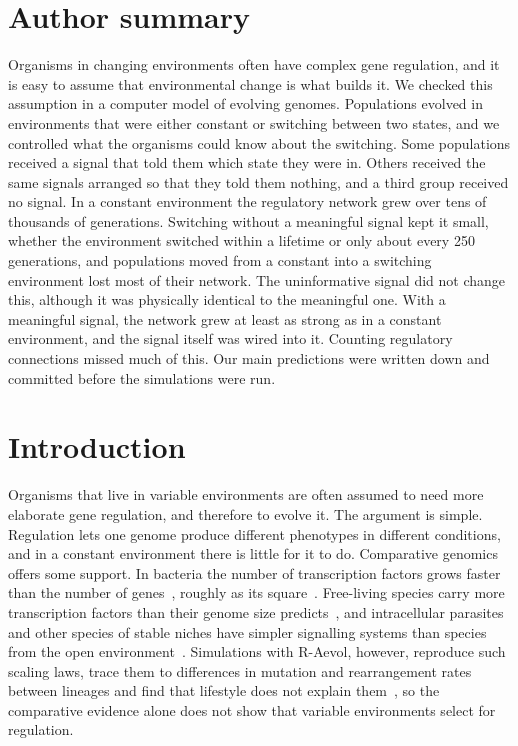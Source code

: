 \documentclass[10pt,letterpaper]{article}
\begin{document}
\section*{Author summary}
Organisms in changing environments often have complex gene regulation, and it
is easy to assume that environmental change is what builds it. We checked this
assumption in a computer model of evolving genomes. Populations evolved in
environments that were either constant or switching between two states, and we
controlled what the organisms could know about the switching. Some populations
received a signal that told them which state they were in. Others received the
same signals arranged so that they told them nothing, and a third group received
no signal. In a constant environment the regulatory network grew over tens of thousands
of generations. Switching without a meaningful signal kept it small, whether
the environment switched within a lifetime or only about every 250 generations,
and populations moved from a constant into a switching environment lost most of
their network. The uninformative signal did not change this, although it was
physically identical to the meaningful one. With a meaningful signal, the network
grew at least as strong as in a constant environment, and the signal itself was
wired into it. Counting regulatory connections missed much of this. Our main predictions were written down and committed before the simulations
were run.

\clearpage
{}
\fancyheadoffset[L]{0pt}\fancyfootoffset[L]{0pt}
\linenumbers

\section*{Introduction}

Organisms that live in variable environments are often assumed to need more
elaborate gene regulation, and therefore to evolve it. The argument is simple.
Regulation lets one genome produce different phenotypes in different
conditions, and in a constant environment there is little for it to do.
Comparative genomics offers some support. In bacteria the number of
transcription factors grows faster than the number of genes~\cite{konstantinidis2004},
roughly as its square~\cite{vannimwegen2003}. Free-living species carry more
transcription factors than their genome size predicts~\cite{cases2003}, and
intracellular parasites and other species of stable niches have simpler
signalling systems than species from the open environment~\cite{galperin2005}.
Simulations with R-Aevol, however, reproduce such scaling laws, trace them to
differences in mutation and rearrangement rates between lineages and find that
lifestyle does not explain them~\cite{beslon2010}, so the comparative evidence alone does not
show that variable environments select for regulation.
\end{document}
